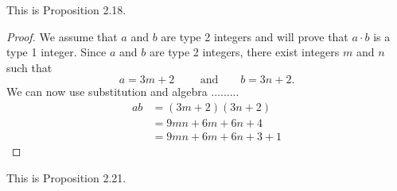\documentclass[12pt]{article}
\newenvironment{customprop}[1]{
  \renewcommand\theproposition{#1}
  \proposition
}{\endproposition}
\begin{document}
\pagestyle{fancy}
\fancyhf{} %
\setlength{\headheight}{41.54604pt}
\addtolength{\topmargin}{-27.04604pt}

\begin{customprop}{2.18}
    This is Proposition 2.18.
\end{customprop}

\begin{proof}
    We assume that $a$ and $b$ are type 2 integers and will prove that $a \cdot b$ is a type 1 integer.  Since $a$ and $b$ are type 2 integers, there exist integers $m$ and $n$ such that
    \[
      a = 3m + 2 \text{ ~~~~~~and~~~~~ } b = 3n + 2.
    \]
    We can now  use substitution and algebra .........
    \begin{align*}
      ab  & = (3m + 2)(3n + 2)      \\
          & = 9mn + 6m + 6n + 4     \\
          & = 9mn + 6m + 6n + 3 + 1
    \end{align*}
\end{proof}
  

\begin{customprop}{2.21}
This is Proposition 2.21.
\end{customprop}
\end{document}
